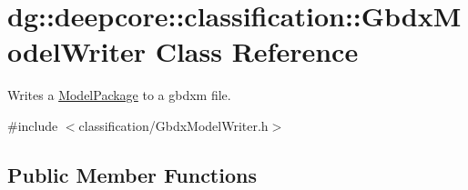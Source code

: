\hypertarget{classdg_1_1deepcore_1_1classification_1_1_gbdx_model_writer}{}\section{dg\+:\+:deepcore\+:\+:classification\+:\+:Gbdx\+Model\+Writer Class Reference}
\label{classdg_1_1deepcore_1_1classification_1_1_gbdx_model_writer}


Writes a \hyperlink{classdg_1_1deepcore_1_1classification_1_1_model_package}{Model\+Package} to a gbdxm file.  




{\ttfamily \#include $<$classification/\+Gbdx\+Model\+Writer.\+h$>$}

\subsection*{Public Member Functions}
